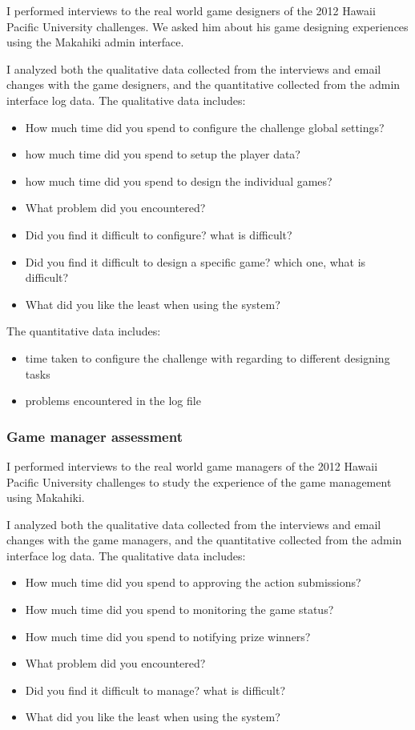 I performed interviews to the real world game designers of the 2012 Hawaii Pacific University challenges. We asked him about his game designing experiences using the Makahiki admin
 interface.

I analyzed both the qualitative data collected from the interviews and email changes with the game designers, and the quantitative collected from the admin interface log data. The qualitative data includes:
\begin{itemize}
    \item How much time did you spend to configure the challenge global settings?
    \item how much time did you spend to setup the player data?
    \item how much time did you spend to design the individual games?
    \item What problem did you encountered?
    \item Did you find it difficult to configure? what is difficult?
    \item Did you find it difficult to design a specific game? which one, what is difficult?
    \item What did you like the least when using the system?
\end{itemize}

The quantitative data includes:
\begin{itemize}
 \item time taken to configure the challenge with regarding to different designing tasks
 \item problems encountered in the log file
\end{itemize}

\subsubsection{Game manager assessment}
I performed interviews to the real world game managers of the 2012 Hawaii Pacific University challenges to study the experience of the game management using Makahiki.

I analyzed both the qualitative data collected from the interviews and email changes with the game managers, and the quantitative collected from the admin interface log data. The qualitative data includes:
\begin{itemize}
\item How much time did you spend to approving the action submissions?
\item How much time did you spend to monitoring the game status?
\item How much time did you spend to notifying prize winners?
\item What problem did you encountered?
\item Did you find it difficult to manage? what is difficult?
\item What did you like the least when using the system?
\end{itemize}

